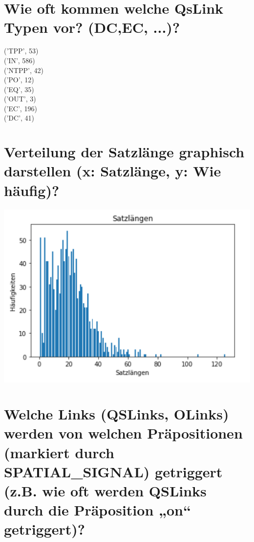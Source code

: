 \documentclass[12pt,fleqn]{article}
\begin{document}
\section*{Wie oft kommen welche QsLink Typen vor? (DC,EC, ...)?}
('TPP', 53)  \\
('IN', 586)  \\
('NTPP', 42)\\
('PO', 12)  \\
('EQ', 35)  \\
('OUT', 3)  \\  
('EC', 196)  \\
('DC', 41)  \\

\section*{Verteilung der Satzlänge graphisch darstellen (x: Satzlänge, y: Wie häufig)?}
\includegraphics[scale=4]{satzlaenge.png}

\section*{Welche Links (QSLinks, OLinks) werden von welchen Präpositionen (markiert durch SPATIAL\_SIGNAL) getriggert (z.B. wie oft werden QSLinks durch die Präposition „on“ getriggert)?}
\end{document}
